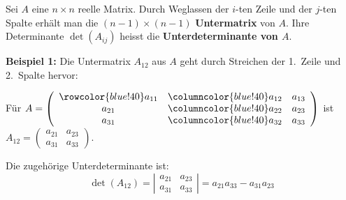 
Sei $A$ eine $n \times n$ reelle Matrix.
Durch Weglassen der $i$-ten Zeile und der $j$-ten Spalte erhält man die $(n-1) \times (n-1)$  \textbf{Untermatrix} von $A$.
Ihre Determinante $\det(A_{ij})$ heisst die \textbf{Unterdeterminante von $A$}.

\textbf{Beispiel 1:} Die Untermatrix $A_{12}$ aus $A$ geht durch Streichen der 1.\ Zeile und 2.\ Spalte hervor:

Für $A = \left(
\begin{array}{c>{\columncolor{blue!40}}cc}
    \rowcolor{blue!40}
    a_{11} & a_{12} & a_{13} \\
    a_{21} & a_{22} & a_{23} \\
    a_{31} & a_{32} & a_{33}
\end{array}
\right)$ ist $A_{12} = \left(
\begin{array}{cc}
    a_{21} & a_{23} \\
    a_{31} & a_{33}
\end{array}
\right)$.

Die zugehörige Unterdeterminante ist:
\[\det(A_{12}) = \left|
\begin{array}{cc}
    a_{21} & a_{23} \\
    a_{31} & a_{33}
\end{array}
\right| = a_{21} a_{33} - a_{31} a_{23}\]

